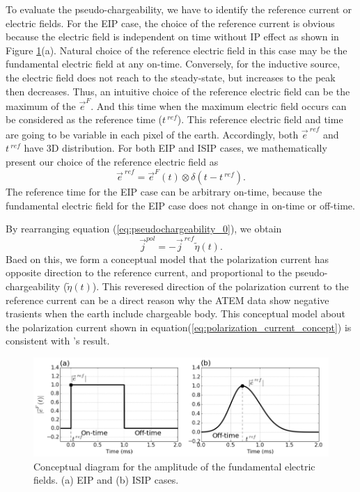 \documentclass[a4paper, 11pt]{article}
\renewcommand {\j}  { {\vec j} }
\newcommand {\e}  { {\vec e} }
\newcommand{\peta}{\tilde{\eta}}
\newcommand{\eref}{\e^{\ ref}}
\newcommand{\jref}{\j^{\ ref}}
\begin{document}
To evaluate the pseudo-chargeability, we have to identify the reference current or electric fields. 
For the EIP case, the choice of the reference current is obvious because the electric field is independent on time without IP effect as shown in Figure \ref{F:DCEM_F_current}(a). 
Natural choice of the reference electric field in this case may be the fundamental electric field at any on-time. 
Conversely, for the inductive source, the electric field does not reach to the steady-state, but increases to the peak then decreases. 
Thus, an intuitive choice of the reference electric field can be the maximum of the $\e^{F}$. 
And this time when the maximum electric field occurs can be considered as the reference time ($t^{\ ref}$).
This reference electric field and time are going to be variable in each pixel of the earth. 
Accordingly, both $\eref$ and $t^{\ ref}$ have 3D distribution. 
For both EIP and ISIP cases, we mathematically present our choice of the reference electric field as
\begin{equation}
  \eref = \e^{F}(t) \otimes \delta(t-t^{\ ref}). 
  \label{eq:reference_electricfield}
\end{equation}
The reference time for the EIP case can be arbitrary on-time, because the fundamental electric field for the EIP case does not change in on-time or off-time. 

By rearranging equation (\ref{eq:pseudochargeability_0}), we obtain 
\begin{equation}
  \j^{pol} = -\jref\peta(t). 
  \label{eq:polarization_current_concept}
\end{equation}
Baed on this, we form a conceptual model that the polarization current has opposite direction to the reference current, and proportional to the pseudo-chargeability ($\peta(t)$). 
This reveresed direction of the polarization current to the reference current can be a direct reason why the ATEM data show negative trasients when the earth include chargeable body. 
This conceptual model about the polarization current shown in equation(\ref{eq:polarization_current_concept}) is consistent with \cite{seigel1959}'s result. 
\begin{figure}
  \centering  
  \includegraphics[width=1.0\textwidth]{figures/DCEM_F_current.png}
  \caption{Conceptual diagram for the amplitude of the fundamental electric fields. (a) EIP and (b) ISIP cases.}
  \label{F:DCEM_F_current}
\end{figure}
  
\end{document}
